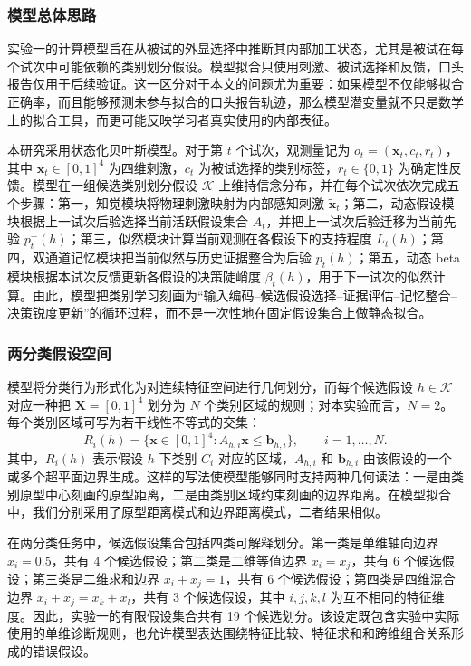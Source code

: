 \subsubsection{模型总体思路}

实验一的计算模型旨在从被试的外显选择中推断其内部加工状态，尤其是被试在每个试次中可能依赖的类别划分假设。模型拟合只使用刺激、被试选择和反馈，口头报告仅用于后续验证。这一区分对于本文的问题尤为重要：如果模型不仅能够拟合正确率，而且能够预测未参与拟合的口头报告轨迹，那么模型潜变量就不只是数学上的拟合工具，而更可能反映学习者真实使用的内部表征。

本研究采用状态化贝叶斯模型。对于第 $t$ 个试次，观测量记为 $o_t=(\mathbf{x}_t,c_t,r_t)$，其中 $\mathbf{x}_t\in[0,1]^4$ 为四维刺激，$c_t$ 为被试选择的类别标签，$r_t\in\{0,1\}$ 为确定性反馈。模型在一组候选类别划分假设 $\mathcal K$ 上维持信念分布，并在每个试次依次完成五个步骤：第一，知觉模块将物理刺激映射为内部感知刺激 $\tilde{\mathbf{x}}_t$；第二，动态假设模块根据上一试次后验选择当前活跃假设集合 $A_t$，并把上一试次后验迁移为当前先验 $p_t^-(h)$；第三，似然模块计算当前观测在各假设下的支持程度 $L_t(h)$；第四，双通道记忆模块把当前似然与历史证据整合为后验 $p_t(h)$；第五，动态 beta 模块根据本试次反馈更新各假设的决策陡峭度 $\beta_t(h)$，用于下一试次的似然计算。由此，模型把类别学习刻画为“输入编码--候选假设选择--证据评估--记忆整合--决策锐度更新”的循环过程，而不是一次性地在固定假设集合上做静态拟合。

\subsubsection{两分类假设空间}

模型将分类行为形式化为对连续特征空间进行几何划分，而每个候选假设 $h\in\mathcal K$ 对应一种把 $\mathbf X=[0,1]^4$ 划分为 $N$ 个类别区域的规则；对本实验而言，$N=2$。每个类别区域可写为若干线性不等式的交集：
\begin{equation}
    R_i(h)=\{\mathbf{x}\in[0,1]^4: A_{h,i}\mathbf{x}\leq \mathbf{b}_{h,i}\},
    \qquad i=1,\ldots,N.
    \label{eq:exp1-region}
\end{equation}
其中，$R_i(h)$ 表示假设 $h$ 下类别 $C_i$ 对应的区域，$A_{h,i}$ 和 $\mathbf{b}_{h,i}$ 由该假设的一个或多个超平面边界生成。这样的写法使模型能够同时支持两种几何读法：一是由类别原型中心刻画的原型距离，二是由类别区域约束刻画的边界距离。在模型拟合中，我们分别采用了原型距离模式和边界距离模式，二者结果相似。

在两分类任务中，候选假设集合包括四类可解释划分。第一类是单维轴向边界 $x_i=0.5$，共有 4 个候选假设；第二类是二维等值边界 $x_i=x_j$，共有 6 个候选假设；第三类是二维求和边界 $x_i+x_j=1$，共有 6 个候选假设；第四类是四维混合边界 $x_i+x_j=x_k+x_l$，共有 3 个候选假设，其中 $i,j,k,l$ 为互不相同的特征维度。因此，实验一的有限假设集合共有 19 个候选划分。该设定既包含实验中实际使用的单维诊断规则，也允许模型表达围绕特征比较、特征求和和跨维组合关系形成的错误假设。

